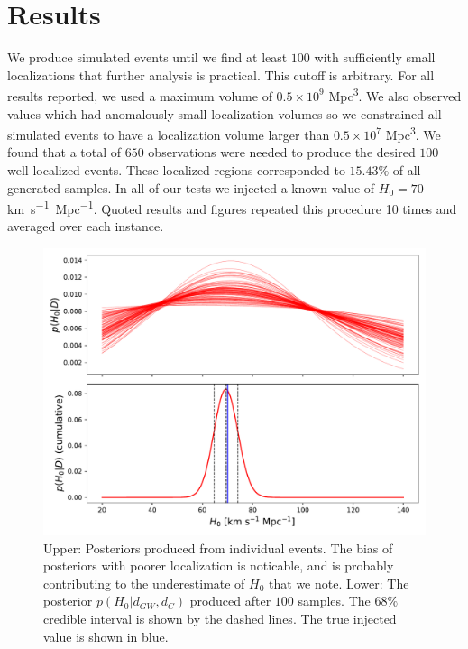 \section{Results} \label{sec:conclusions}
We produce simulated events until we find at least $100$ with sufficiently small localizations that further analysis is practical.
This cutoff is arbitrary. For all results reported, we used a maximum volume of $0.5\times 10^{9}$ \si{Mpc^3}.
We also observed values which had anomalously small localization volumes so we constrained all simulated events to have a localization volume larger than $0.5\times 10^{7}$ \si{Mpc^3}.
We found that a total of $650$ observations were needed to produce the desired $100$ well localized events.
These localized regions corresponded to $15.43\%$ of all generated samples.
In all of our tests we injected a known value of $H_0=70$ \si{km.s^{-1}.Mpc^{-1}}.
Quoted results and figures repeated this procedure 10 times and averaged over each instance.


\begin{figure}[t]
    \centering
    \includegraphics[width=\columnwidth]{figures/posterior.pdf}
    \caption{Upper: Posteriors produced from individual events. The bias of posteriors with poorer localization is noticable, and is probably contributing to the underestimate of $H_0$ that we note. Lower: The posterior $p(H_0 | d_{GW}, d_C)$ produced after $100$ samples. The $68\%$ credible interval is shown by the dashed lines. The true injected value is shown in blue.}
    \label{fig:posterior}
\end{figure}

